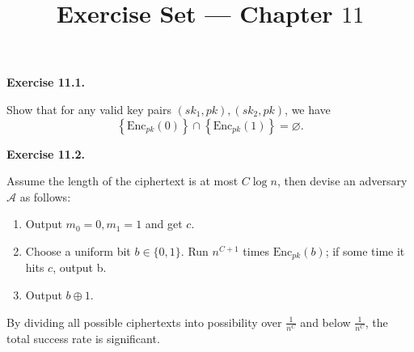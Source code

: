 \documentclass[a4paper]{article}
\title{Exercise Set --- Chapter $11$}
\date{}
\newenvironment{exercise}[1]{
	\par
	\noindent\textbf{Exercise #1.}\quad
}{
	\par
	\bigskip
}
\newcommand{\cbra}[1]{\left\{ #1 \right\}}
\newcommand{\bin}{\{0,1\}}
\newcommand{\Enc}{\mathrm{Enc}}
\newcommand{\Acal}{\mathcal{A}}
\begin{document}
\maketitle

\begin{exercise}{11.1}
    Show that for any valid key pairs $(sk_1,pk),(sk_2,pk)$, 
    we have 
    $$\cbra{\Enc_{pk}(0)}\cap\cbra{\Enc_{pk}(1)}=\varnothing.$$
\end{exercise}

\begin{exercise}{11.2}
    Assume the length of the ciphertext is at most $C\log n$, then devise an adversary $\Acal$ as follows:
    \begin{enumerate}
        \item Output $m_0=0,m_1=1$ and get $c$.
        \item Choose a uniform bit $b\in\bin$. Run $n^{C+1}$ times $\Enc_{pk}(b)$; if some time it hits $c$, output b.
        \item Output $b\oplus 1$.
    \end{enumerate}
    By dividing all possible ciphertexts into possibility over $\frac1{n^C}$ and below $\frac1{n^C}$,
    the total success rate is significant.
\end{exercise}
\end{document}
